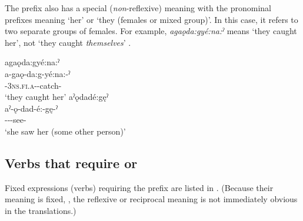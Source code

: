 \z
\z

The  prefix also has a special (\emph{non}-reflexive) meaning with the pronominal prefixes meaning ‘her’ or ‘they (females or mixed group)’. In this case, it refers to two separate groups of females. For example, \textit{agaǫda:gyé:na:ˀ} means ‘they caught her’, not ‘they caught \emph{themselves}’ .

\ea\label{ex:rflsrfex4}
\ea agaǫda:gyé:na:ˀ\\
\gll a-gaǫ-da:g-yé:na:-ˀ\\
 {\factual}-\textsc{3ns.fi.a}-{}-catch-{\punctual}\\
\glt `they caught her'
\ex aˀǫdadé:gęˀ\\
\gll aˀ-ǫ-dad-é:-gę-ˀ\\
 {\factual}--{\joinerE}-see-{\punctual}\\
\glt `she saw her (some other person)'
\z
\z

\subsection{Verbs that require   \textsc{} or \textsc{\reciprocal}} \label{Verbs that require the [adad-] (reflexive or reciprocal) prefix}
Fixed expressions (verbs) requiring the  prefix are listed in . (Because their meaning is fixed, , the reflexive or reciprocal meaning is not immediately obvious in the translations.)

